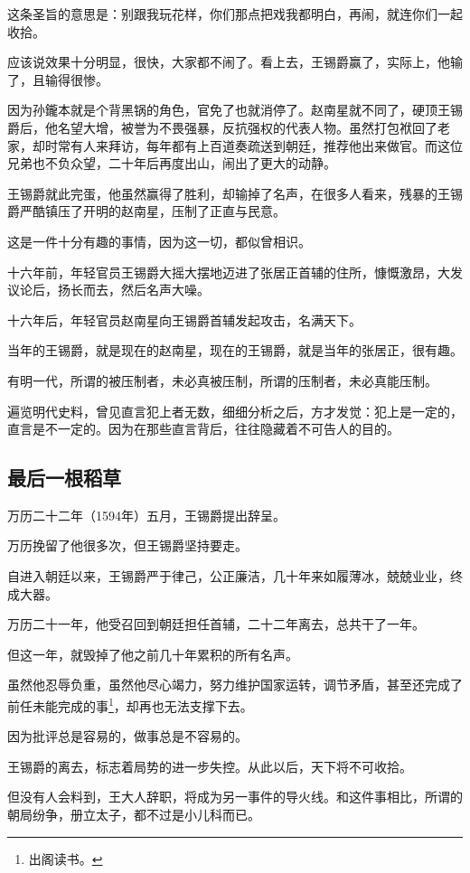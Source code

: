 \begin{multicols}{\theparacolNo}
		这条圣旨的意思是：别跟我玩花样，你们那点把戏我都明白，再闹，就连你们一起收拾。

		应该说效果十分明显，很快，大家都不闹了。看上去，王锡爵赢了，实际上，他输了，且输得很惨。

		因为孙鑨本就是个背黑锅的角色，官免了也就消停了。赵南星就不同了，硬顶王锡爵后，他名望大增，被誉为不畏强暴，反抗强权的代表人物。虽然打包袱回了老家，却时常有人来拜访，每年都有上百道奏疏送到朝廷，推荐他出来做官。而这位兄弟也不负众望，二十年后再度出山，闹出了更大的动静。

		王锡爵就此完蛋，他虽然赢得了胜利，却输掉了名声，在很多人看来，残暴的王锡爵严酷镇压了开明的赵南星，压制了正直与民意。

		这是一件十分有趣的事情，因为这一切，都似曾相识。

		十六年前，年轻官员王锡爵大摇大摆地迈进了张居正首辅的住所，慷慨激昂，大发议论后，扬长而去，然后名声大噪。

		十六年后，年轻官员赵南星向王锡爵首辅发起攻击，名满天下。

		当年的王锡爵，就是现在的赵南星，现在的王锡爵，就是当年的张居正，很有趣。

		有明一代，所谓的被压制者，未必真被压制，所谓的压制者，未必真能压制。

		遍览明代史料，曾见直言犯上者无数，细细分析之后，方才发觉：犯上是一定的，直言是不一定的。因为在那些直言背后，往往隐藏着不可告人的目的。

		\subsection{最后一根稻草}
		万历二十二年（1594年）五月，王锡爵提出辞呈。

		万历挽留了他很多次，但王锡爵坚持要走。

		自进入朝廷以来，王锡爵严于律己，公正廉洁，几十年来如履薄冰，兢兢业业，终成大器。

		万历二十一年，他受召回到朝廷担任首辅，二十二年离去，总共干了一年。

		但这一年，就毁掉了他之前几十年累积的所有名声。

		虽然他忍辱负重，虽然他尽心竭力，努力维护国家运转，调节矛盾，甚至还完成了前任未能完成的事\footnote{出阁读书。}，却再也无法支撑下去。

		因为批评总是容易的，做事总是不容易的。

		王锡爵的离去，标志着局势的进一步失控。从此以后，天下将不可收拾。

		但没有人会料到，王大人辞职，将成为另一事件的导火线。和这件事相比，所谓的朝局纷争，册立太子，都不过是小儿科而已。
		\ifnum{}
	\end{multicols}
\fi
\newpage
